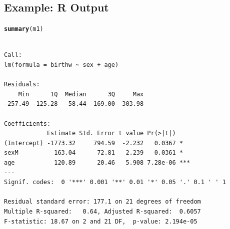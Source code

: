 \documentclass[oneside]{book}\usepackage[]{graphicx}\usepackage[svgnames]{xcolor}
\makeatletter
\newcommand{\hlstd}[1]{\textcolor[rgb]{0.345,0.345,0.345}{#1}}%
\newcommand{\hlkwd}[1]{\textcolor[rgb]{0.737,0.353,0.396}{\textbf{#1}}}%
\newenvironment{kframe}{%
 \def\at@end@of@kframe{}%
 \ifinner\ifhmode%
  \def\at@end@of@kframe{\end{minipage}}%
  \begin{minipage}{\columnwidth}%
 \fi\fi%
 \def\FrameCommand##1{\hskip\@totalleftmargin \hskip-\fboxsep
 \colorbox{shadecolor}{##1}\hskip-\fboxsep
     \hskip-\linewidth \hskip-\@totalleftmargin \hskip\columnwidth}%
 \MakeFramed {\advance\hsize-\width
   \@totalleftmargin\z@ \linewidth\hsize
   \@setminipage}}%
 {\par\unskip\endMakeFramed%
 \at@end@of@kframe}
\newenvironment{knitrout}{}{} %
\makeatother
\begin{document}
\subsection*{Example: R Output}
\begin{knitrout}
\color{fgcolor}\begin{kframe}
\begin{alltt}
\hlkwd{summary}\hlstd{(m1)}
\end{alltt}
\begin{verbatim}

Call:
lm(formula = birthw ~ sex + age)

Residuals:
    Min      1Q  Median      3Q     Max 
-257.49 -125.28  -58.44  169.00  303.98 

Coefficients:
            Estimate Std. Error t value Pr(>|t|)    
(Intercept) -1773.32     794.59  -2.232   0.0367 *  
sexM          163.04      72.81   2.239   0.0361 *  
age           120.89      20.46   5.908 7.28e-06 ***
---
Signif. codes:  0 '***' 0.001 '**' 0.01 '*' 0.05 '.' 0.1 ' ' 1

Residual standard error: 177.1 on 21 degrees of freedom
Multiple R-squared:   0.64,	Adjusted R-squared:  0.6057 
F-statistic: 18.67 on 2 and 21 DF,  p-value: 2.194e-05
\end{verbatim}
\end{kframe}
\end{knitrout}
\end{document}

